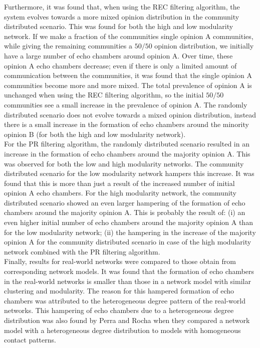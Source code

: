 \documentclass[11 pt , letterpaper , twoside , openright]{book}
\begin{document}
\newline
Furthermore, it was found that, when using the REC filtering algorithm, the system evolves towards a more mixed opinion distribution in the community distributed scenario. This was found for both the high and low modularity network. If we make a fraction of the communities single opinion A communities, while giving the remaining communities a $50/50$ opinion distribution, we initially have a large number of echo chambers around opinion A. Over time, these opinion A echo chambers decrease; even if there is only a limited amount of communication between the communities, it was found that the single opinion A communities become more and more mixed. The total prevalence of opinion A is unchanged when using the REC filtering algorithm, so the initial $50/50$ communities see a small increase in the prevalence of opinion A. The randomly distributed scenario does not evolve towards a mixed opinion distribution, instead there is a small increase in the formation of echo chambers around the minority opinion B (for both the high and low modularity network).\\
\newline
For the PR filtering algorithm, the randomly distributed scenario resulted in an increase in the formation of echo chambers around the majority opinion A. This was observed for both the low and high modularity networks. The community distributed scenario for the low modularity network hampers this increase. It was found that this is more than just a result of the increased number of initial opinion A echo chambers. For the high modularity network, the community distributed scenario showed an even larger hampering of the formation of echo chambers around the majority opinion A. This is probably the result of: (i) an even higher initial number of echo chambers around the majority opinion A than for the low modularity network; (ii) the hampering in the increase of the majority opinion A for the community distributed scenario in case of the high modularity network combined with the PR filtering algorithm. \\
\newline
Finally, results for real-world networks were compared to those obtain from corresponding network models. It was found that the formation of echo chambers in the real-world networks is smaller than those in a network model with similar clustering and modularity. The reason for this hampered formation of echo chambers was attributed to the heterogeneous degree pattern of the real-world networks. This hampering of echo chambers due to a heterogeneous degree distribution was also found by Perra and Rocha \cite{Perra2019} when they compared a network model with a heterogeneous degree distribution to models with homogeneous contact patterns.\\
\end{document}
